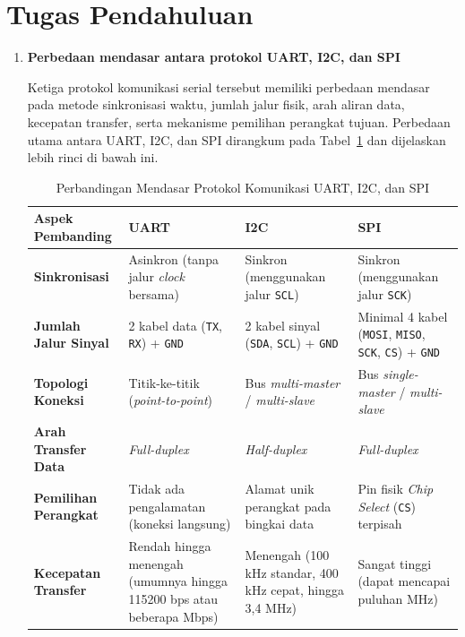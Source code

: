 \section{Tugas Pendahuluan}
\begin{enumerate}[label=\textbf{\arabic*.}, leftmargin=*, itemsep=10pt]

    \item \textbf{Perbedaan mendasar antara protokol UART, I2C, dan SPI}

    Ketiga protokol komunikasi serial tersebut memiliki perbedaan mendasar pada metode sinkronisasi waktu, jumlah jalur fisik, arah aliran data, kecepatan transfer, serta mekanisme pemilihan perangkat tujuan. Perbedaan utama antara UART, I2C, dan SPI dirangkum pada Tabel~\ref{tab:perbedaan_protokol} dan dijelaskan lebih rinci di bawah ini.

    \begin{table}[h!]
        \centering
        \caption{Perbandingan Mendasar Protokol Komunikasi UART, I2C, dan SPI}
        \label{tab:perbedaan_protokol}
        \vspace{4pt}
        \begin{tabularx}{\textwidth}{>{\bfseries}l X X X}
            \toprule
            Aspek Pembanding & UART & I2C & SPI \\
            \midrule
            Sinkronisasi & Asinkron (tanpa jalur \textit{clock} bersama) & Sinkron (menggunakan jalur \texttt{SCL}) & Sinkron (menggunakan jalur \texttt{SCK}) \\
            \addlinespace[4pt]
            Jumlah Jalur Sinyal & 2 kabel data (\texttt{TX}, \texttt{RX}) + \texttt{GND} & 2 kabel sinyal (\texttt{SDA}, \texttt{SCL}) + \texttt{GND} & Minimal 4 kabel (\texttt{MOSI}, \texttt{MISO}, \texttt{SCK}, \texttt{CS}) + \texttt{GND} \\
            \addlinespace[4pt]
            Topologi Koneksi & Titik-ke-titik (\textit{point-to-point}) & Bus \textit{multi-master} / \textit{multi-slave} & Bus \textit{single-master} / \textit{multi-slave} \\
            \addlinespace[4pt]
            Arah Transfer Data & \textit{Full-duplex} & \textit{Half-duplex} & \textit{Full-duplex} \\
            \addlinespace[4pt]
            Pemilihan Perangkat & Tidak ada pengalamatan (koneksi langsung) & Alamat unik perangkat pada bingkai data & Pin fisik \textit{Chip Select} (\texttt{CS}) terpisah \\
            \addlinespace[4pt]
            Kecepatan Transfer & Rendah hingga menengah (umumnya hingga 115200 bps atau beberapa Mbps) & Menengah (100 kHz standar, 400 kHz cepat, hingga 3,4 MHz) & Sangat tinggi (dapat mencapai puluhan MHz) \\
            \bottomrule
        \end{tabularx}
    \end{table}


\end{enumerate}
